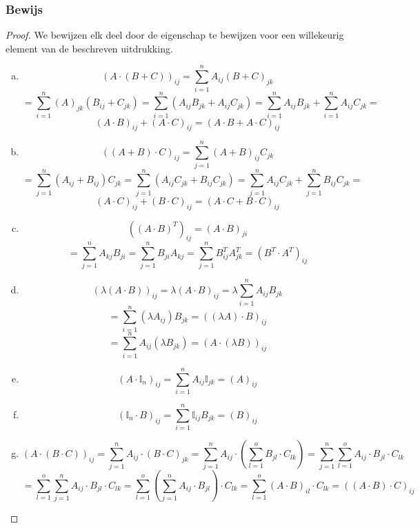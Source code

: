 \documentclass[lineaire_algebra_oplossingen.tex]{subfiles}
\begin{document}
\subsubsection*{Bewijs}
\begin{proof}
We bewijzen elk deel door de eigenschap te bewijzen voor een willekeurig element van de beschreven uitdrukking.
\begin{enumerate}[(a)]
\item 
\[ (A\cdot (B+C))_{ij} = \sum_{i=1}^nA_{ij}(B+C)_{jk}\]
\[ = \sum_{i=1}^n(A)_{jk}(B_{ij}+C_{jk}) = \sum_{i=1}^n (A_{ij}B_{jk}+A_{ij}C_{jk}) = \sum_{i=1}^nA_{ij}B_{jk} + \sum_{i=1}^nA_{ij}C_{jk} = \]
\[ (A\cdot B)_{ij} + (A \cdot C)_{ij} = (A\cdot B + A \cdot C)_{ij}\]

\item 
\[ ((A+B) \cdot C)_{ij} = \sum_{j=1}^n(A+B)_{ij}C_{jk}\]
\[ = \sum_{j=1}^n(A_{ij}+B_{ij})C_{jk} = \sum_{j=1}^n (A_{ij}C_{jk}+B_{ij}C_{jk}) = \sum_{j=1}^nA_{ij}C_{jk} + \sum_{j=1}^nB_{ij}C_{jk} = \]
\[ (A\cdot C)_{ij} + (B \cdot C)_{ij} = (A\cdot C + B \cdot C)_{ij} \]

\item 
\[ ((A\cdot B)^T)_{ij}  = (A\cdot B)_{ji}\]
\[ = \sum_{j=1}^nA_{kj}B_{ji} = \sum_{j=1}^nB_{ji}A_{kj} = \sum_{j=1}^nB^T_{ij}A^T_{jk} = (B^T \cdot A^T)_{ij} \]

\item 
\[ (\lambda(A\cdot B))_{ij} = \lambda(A\cdot B)_{ij} = \lambda\sum_{i=1}^nA_{ij}B_{jk}\]
\[ = \sum_{i=1}^n(\lambda A_{ij})B_{jk} = ((\lambda A)\cdot B)_{ij} \]
\[ = \sum_{i=1}^nA_{ij}(\lambda B_{jk}) = (A \cdot (\lambda B))_{ij}\]

\item 
\[ (A \cdot \mathbb{I}_{n})_{ij} = \sum_{i=1}^nA_{ij}\mathbb{I}_{jk} = (A)_{ij} \]

\item 
\[ (\mathbb{I}_{n} \cdot B)_{ij} =  \sum_{i=1}^n\mathbb{I}_{ij}B_{jk} =  (B)_{ij} \]

\item
\[
(A\cdot (B\cdot C))_{ij}
= \sum_{j=1}^n A_{ij}\cdot (B\cdot C)_{jk}
= \sum_{j=1}^n A_{ij}\cdot \left( \sum_{l=1}^o B_{jl}\cdot C_{lk} \right)
= \sum_{j=1}^n \sum_{l=1}^o A_{ij}\cdot B_{jl}\cdot C_{lk}
\]
\[
= \sum_{l=1}^o \sum_{j=1}^n  A_{ij}\cdot B_{jl}\cdot C_{lk}
= \sum_{l=1}^o \left(\sum_{j=1}^n  A_{ij}\cdot B_{jl}\right)\cdot C_{lk}
= \sum_{l=1}^o (A\cdot B)_{il} \cdot C_{lk}
= ((A\cdot B) \cdot C)_{ij}
\]

\end{enumerate}
\end{proof}
\end{document}
